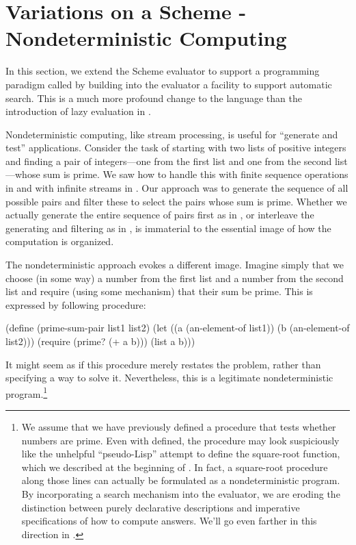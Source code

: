 \section{Variations on a Scheme - Nondeterministic Computing}
\label{Section 4.3}

In this section, we extend the Scheme evaluator to support a programming
paradigm called  by building into the
evaluator a facility to support automatic search.  This is a much more profound
change to the language than the introduction of lazy evaluation in
.

Nondeterministic computing, like stream processing, is useful for ``generate
and test'' applications.  Consider the task of starting with two lists of
positive integers and finding a pair of integers---one from the first list and
one from the second list---whose sum is prime.  We saw how to handle this with
finite sequence operations in  and with infinite streams in
.  Our approach was to generate the sequence of all possible
pairs and filter these to select the pairs whose sum is prime.  Whether we
actually generate the entire sequence of pairs first as in , or
interleave the generating and filtering as in , is immaterial to
the essential image of how the computation is organized.

The nondeterministic approach evokes a different image.  Imagine simply that we
choose (in some way) a number from the first list and a number from the second
list and require (using some mechanism) that their sum be prime.  This is
expressed by following procedure:

\begin{codeBlock}
(define (prime-sum-pair list1 list2)
  (let ((a (an-element-of list1))
        (b (an-element-of list2)))
    (require (prime? (+ a b)))
    (list a b)))
\end{codeBlock}

\noindent
It might seem as if this procedure merely restates the problem, rather than
specifying a way to solve it.  Nevertheless, this is a legitimate
nondeterministic program.\footnote{We assume that we have previously defined a
procedure  that tests whether numbers are prime.  Even with
 defined, the  procedure may look
suspiciously like the unhelpful ``pseudo-Lisp'' attempt to define the
square-root function, which we described at the beginning of
.  In fact, a square-root procedure along those lines can actually
be formulated as a nondeterministic program.  By incorporating a search
mechanism into the evaluator, we are eroding the distinction between purely
declarative descriptions and imperative specifications of how to compute
answers.  We'll go even farther in this direction in .}

